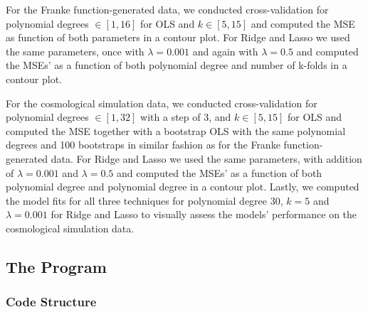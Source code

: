 \documentclass[aps,pra,english,notitlepage,reprint,nofootinbib]{revtex4-1}  %
\begin{document}
For the Franke function-generated data, we conducted cross-validation for polynomial degrees $ \in [1,16]$ for OLS and $k \in [5,15]$ and computed the MSE as function of both parameters in a contour plot. For Ridge and Lasso we used the same parameters, once with $\lambda = 0.001$ and again with $\lambda = 0.5$ and computed the MSEs' as a function of both polynomial degree and number of k-folds in a contour plot.

For the cosmological simulation data, we conducted cross-validation for polynomial degrees $\in [1, 32]$ with a step of 3, and $k \in [5, 15]$ for OLS and computed the MSE together with a bootstrap OLS with the same polynomial degrees and 100 bootstraps in similar fashion as for the Franke function-generated data. For Ridge and Lasso we used the same parameters, with addition of $\lambda = 0.001$ and $\lambda = 0.5$ and computed the MSEs' as a function of both polynomial degree and polynomial degree in a contour plot. Lastly, we computed the model fits for all three techniques for polynomial degree 30, $ k = 5$ and $\lambda = 0.001$ for Ridge and Lasso to visually assess the models' performance on the cosmological simulation data.


\subsection{The Program}\label{subsec:program}
\subsubsection{Code Structure}\label{subsubsec:codestructure}
\end{document}

